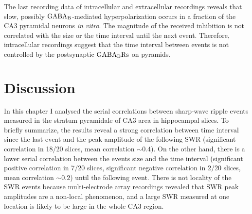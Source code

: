     The last recording data of intracellular and extracellular recordings
    reveals that slow, possibly $\rm GABA_B$-mediated hyperpolarization occurs
    in a fraction of the CA3 pyramidal neurons \textit{in vitro}. The magnitude
    of the received inhibition is not correlated with the size or the time
    interval until the next event. Therefore, intracellular recordings suggest
    that the time interval between events is not controlled by the postsynaptic
    $\rm GABA_B Rs$ on pyramids.
 
    \begin{comment}
    How do $\rm GABA_B Rs$ influence the SWR incidence? There are many
    possible GABA binding sites that may modulate the observed effects. For
    example, in the light of the 3-population hypothesis, postsynaptic $\rm
    GABA_B Rs$ on PVBC \citep{Booker2013} or PCs \citep{Kulik2006, Degro2015}
    can limit the rate of population bursts that disinhibit the network and lead to
    SWs. Another possibility is the autoreceptors on the PVBC-mIN synapses
    \citep{Lei2003, Booker2013}, where $\rm GABA_BR$ activation decreases the
    inhibition on mINs in the background state. Blocking the heteroreceptors on
    PCs \citep{Lei2003, Lopez2004, Kulik2006} or on PVBCs \citep{Lei2003} could
    also lead to an increased incidence of SWR events. To what degree are these
    five mechanisms involved in the studied \textit{in-vitro} circuit is not
    known. Measuring the firing rate of the populations (e.g., PVBCs and PCs)
    during and between SWR events and the firing-rate change after $\rm GABA_B$
    modulators (agonist or antagonist) can shed some light on the role of the
    receptors.
    \end{comment}


\section{Discussion}
  In this chapter I analysed the serial correlations between sharp-wave ripple
  events measured in the stratum pyramidale of CA3 area in hippocampal slices.
  To briefly summarize, the results reveal a strong correlation between time
  interval since the last event and the peak amplitude of the following SWR
  (significant correlation in 18/20 slices, mean correlation $\sim 0.4$). On
  the other hand, there is a lower serial correlation between the events size
  and the time interval (significant positive correlation in 7/20 slices,
  significant negative correlation in 2/20 slices, mean correlation $\sim 0.2$)
  until the following event. There is not locality of the SWR events because
  multi-electrode array recordings revealed that SWR peak amplitudes are a
  non-local phenomenon, and a large SWR measured at one location is likely to
  be large in the whole CA3 region. 
  
